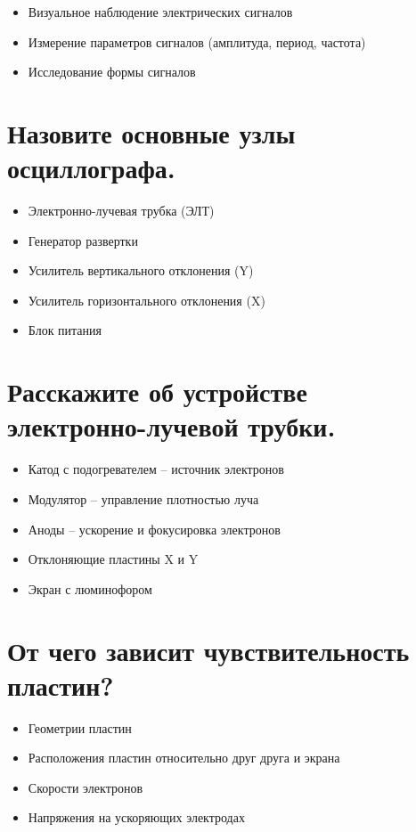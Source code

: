 \documentclass[14pt, a4paper, twoside]{extreport}
\begin{document}
\begin{itemize}
  \item Визуальное наблюдение электрических сигналов
  \item Измерение параметров сигналов (амплитуда, период, частота)
  \item Исследование формы сигналов
\end{itemize}

\section{Назовите основные узлы осциллографа.}

\begin{itemize}
  \item Электронно-лучевая трубка (ЭЛТ)
  \item Генератор развертки
  \item Усилитель вертикального отклонения (Y)
  \item Усилитель горизонтального отклонения (X)
  \item Блок питания
\end{itemize}

\section{Расскажите об устройстве электронно-лучевой трубки.}

\begin{itemize}
  \item Катод с подогревателем -- источник электронов
  \item Модулятор -- управление плотностью луча
  \item Аноды -- ускорение и фокусировка электронов
  \item Отклоняющие пластины X и Y
  \item Экран с люминофором
\end{itemize}

\section{От чего зависит чувствительность пластин?}

\begin{itemize}
  \item Геометрии пластин
  \item Расположения пластин относительно друг друга и экрана
  \item Скорости электронов
  \item Напряжения на ускоряющих электродах
\end{itemize}
\end{document}
